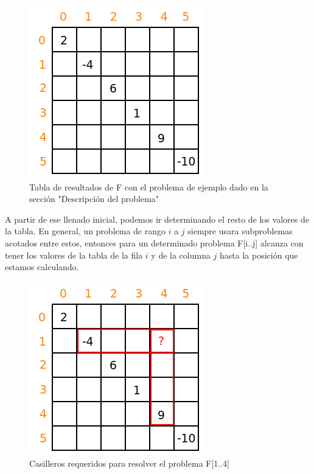 \begin{figure}[h]
\begin{center}
\includegraphics[scale=0.6]{./img/ej1_res2.png}
\caption{Tabla de resultados de F con el problema de ejemplo dado en la secci\'on "Descripci\'on del problema"}
\end{center}
\end{figure}

A partir de ese llenado inicial, podemos ir determinando el resto de los valores de la tabla. En general, un problema de rango $i$ a $j$ siempre usara subproblemas acotados entre estos, entonces para un determinado problema F[i..j] alcanza con tener los valores de la tabla de la fila $i$ y de la columna $j$ hasta la posici\'on que estamos calculando.

\newpage

\begin{figure}[h]
\begin{center}
\includegraphics[scale=0.6]{./img/ej1_res3.png}
\caption{Casilleros requeridos para resolver el problema F[1..4]}
\end{center}
\end{figure}

